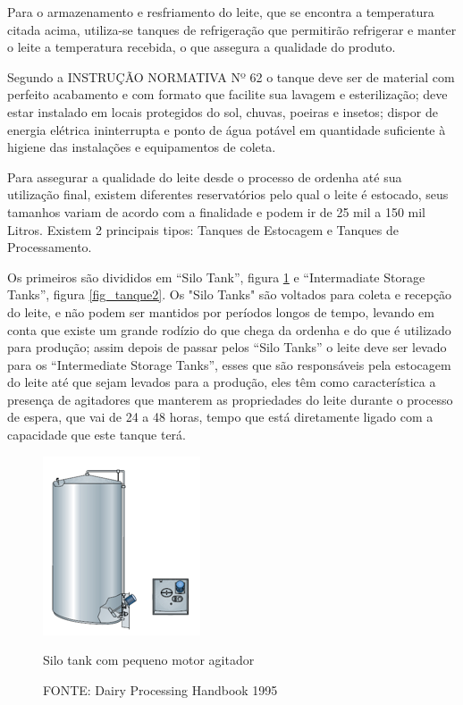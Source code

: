 \documentclass[10pt,a4paper]{article}
\begin{document}
Para o armazenamento  e resfriamento do leite, que se encontra a temperatura citada acima, utiliza-se tanques de refrigeração que permitirão refrigerar e manter o leite a temperatura recebida, o que assegura a qualidade do produto.

Segundo a INSTRUÇÃO NORMATIVA Nº 62 o tanque deve ser de material com perfeito acabamento e com formato que facilite sua lavagem e esterilização; deve estar instalado em locais protegidos do sol, chuvas, poeiras e insetos; dispor de energia elétrica ininterrupta e ponto de água potável em quantidade suficiente à higiene das instalações e equipamentos de coleta.

Para assegurar a qualidade do leite desde o processo de ordenha até sua utilização final, existem diferentes reservatórios pelo qual o leite é estocado, seus tamanhos variam de acordo com a finalidade e podem ir de 25 mil a 150 mil Litros. Existem 2 principais tipos: Tanques de Estocagem e Tanques de Processamento. 

Os primeiros são divididos em “Silo Tank”, figura \ref{fig_tanque1} e “Intermadiate Storage Tanks”, figura \ref{fig_tanque2}. Os "Silo Tanks" são voltados para coleta e recepção do leite, e não podem ser mantidos por períodos longos de tempo, levando em conta que existe um grande rodízio do que chega da ordenha e do que é utilizado para produção; assim depois de passar pelos “Silo Tanks” o leite deve ser levado para os “Intermediate Storage Tanks”, esses que são responsáveis pela estocagem do leite até que sejam levados para a produção, eles têm como característica a presença de agitadores que manterem as propriedades do leite durante o processo de espera, que vai de 24 a 48 horas, tempo que está diretamente ligado com a capacidade que este tanque terá.

\begin{figure}[H]
    \centering
    \includegraphics[scale=0.9]{Figuras/tanque1.png}
    \caption{Silo tank com pequeno motor agitador}
    \caption*{FONTE: Dairy Processing Handbook 1995}
    \label{fig_tanque1}
\end{figure}
\end{document}
